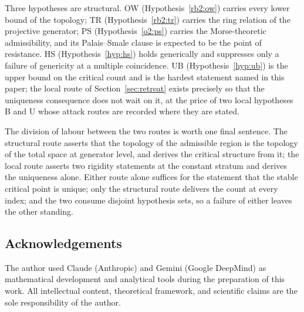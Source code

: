 \documentclass[11pt]{article}
\numberwithin{equation}{section}
\theoremstyle{plain}
\theoremstyle{definition}
\theoremstyle{remark}
\begin{document}
Three hypotheses are structural. OW (Hypothesis~\ref{rb2:ow})
carries every lower bound of the topology; TR
(Hypothesis~\ref{rb2:tr}) carries the ring relation of the
projective generator; PS (Hypothesis~\ref{o2:ps}) carries the
Morse-theoretic admissibility, and its Palais--Smale clause is
expected to be the point of resistance. HS (Hypothesis~\ref{hyp:hs})
holds generically and suppresses only a failure of genericity at a
multiple coincidence. UB (Hypothesis~\ref{hyp:ub}) is the upper
bound on the critical count and is the hardest statement named in
this paper; the local route of Section~\ref{sec:retreat} exists
precisely so that the uniqueness consequence does not wait on it,
at the price of two local hypotheses B and U whose attack routes
are recorded where they are stated.

The division of labour between the two routes is worth one final
sentence. The structural route asserts that the topology of the
admissible region is the topology of the total space at generator
level, and derives the critical structure from it; the local route
asserts two rigidity statements at the constant stratum and derives
the uniqueness alone. Either route alone suffices for the statement
that the stable critical point is unique; only the structural route
delivers the count at every index; and the two consume disjoint
hypothesis sets, so a failure of either leaves the other standing.

\subsection*{Acknowledgements}

The author used Claude (Anthropic) and Gemini (Google DeepMind) as
mathematical development and analytical tools during the
preparation of this work. All intellectual content, theoretical
framework, and scientific claims are the sole responsibility of the
author.
\end{document}
